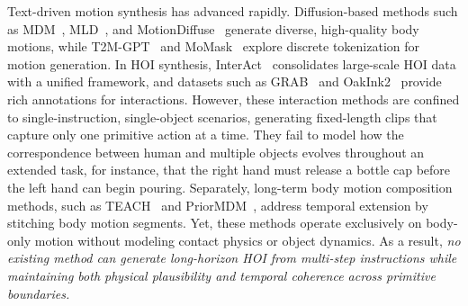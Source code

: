 \documentclass[sigconf, screen, review, anonymous]{acmart}
\begin{document}
Text-driven motion synthesis has advanced rapidly. Diffusion-based methods such as MDM~\cite{tevet2023human}, MLD~\cite{chen2023executing}, and MotionDiffuse~\cite{zhang2022motiondiffuse} generate diverse, high-quality body motions, while T2M-GPT~\cite{zhang2023t2mgpt} and MoMask~\cite{guo2024momask} explore discrete tokenization for motion generation. 
In HOI synthesis, InterAct~\cite{xu2025interact} consolidates large-scale HOI data with a unified framework, and datasets such as GRAB~\cite{taheri2020grab} and OakInk2~\cite{zhan2024oakink2} provide rich annotations for interactions. 
However, these interaction methods are confined to single-instruction, single-object scenarios, generating fixed-length clips that capture only one primitive action at a time. They fail to model how the correspondence between human and multiple objects evolves throughout an extended task, for instance, that the right hand must release a bottle cap before the left hand can begin pouring. 
Separately, long-term body motion composition methods, such as TEACH~\cite{athanasiou2022teach} and PriorMDM~\cite{shafir2024priormdm}, address temporal extension by stitching body motion segments. Yet, these methods operate exclusively on body-only motion without modeling contact physics or object dynamics. As a result, \textit{no existing method can generate long-horizon HOI from multi-step instructions while maintaining both physical plausibility and temporal coherence across primitive boundaries.}
\end{document}
